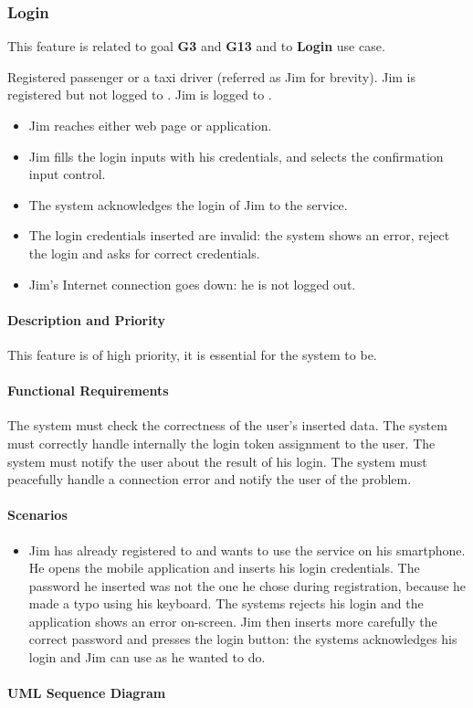 \subsubsection{Login}
This feature is related to goal \textbf{G3} and \textbf{G13} and to \textbf{Login} use case.
\begin{itemize}
	 Registered passenger or a taxi driver (referred as Jim for brevity).
	 Jim is registered but not logged to \myTaxiService{}.
	 Jim is logged to \myTaxiService{}.
	\begin{itemize}
		\item Jim reaches either \myTaxiService{} web page or application.
		\item Jim fills the login inputs with his credentials, and selects the confirmation input control.
		\item The system acknowledges the login of Jim to the service.
	\end{itemize}
	\begin{itemize}
		\item The login credentials inserted are invalid: the system shows an error, reject the login and asks for correct credentials.
		\item Jim's Internet connection goes down: he is not logged out.
	\end{itemize}
\end{itemize}
\paragraph{Description and Priority}
This feature is of high priority, it is essential for the system to be.\par
\paragraph{Functional Requirements}
\begin{itemize}
	 The system must check the correctness of the user's inserted data.
	 The system must correctly handle internally the login token assignment to the user.
	 The system must notify the user about the result of his login.
	 The system must peacefully handle a connection error and notify the user of the problem.
\end{itemize}
\paragraph{Scenarios}
\begin{itemize}
	\item Jim has already registered to \myTaxiService{} and wants to use the service on his smartphone.
	He opens the mobile application and inserts his login credentials.
	The password he inserted was not the one he chose during registration, because he made a typo using his keyboard.
	The systems rejects his login and the application shows an error on-screen.
	Jim then inserts more carefully the correct password and presses the login button: the systems acknowledges his login and Jim can use \myTaxiService{} as he wanted to do.
\end{itemize}
\paragraph{UML Sequence Diagram}
